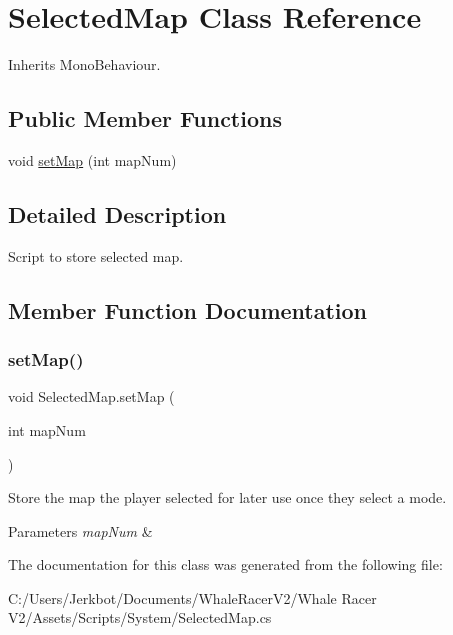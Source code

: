 \hypertarget{class_selected_map}{}\section{Selected\+Map Class Reference}
\label{class_selected_map}


Inherits Mono\+Behaviour.

\subsection*{Public Member Functions}
\begin{DoxyCompactItemize}
\item 
void \hyperlink{class_selected_map_a2667f413fa07f31a89c42f88471afdb7}{set\+Map} (int map\+Num)
\end{DoxyCompactItemize}


\subsection{Detailed Description}
Script to store selected map. 



\subsection{Member Function Documentation}
\mbox{\label{class_selected_map_a2667f413fa07f31a89c42f88471afdb7}} 
\subsubsection{\texorpdfstring{set\+Map()}{setMap()}}
{\footnotesize\ttfamily void Selected\+Map.\+set\+Map (\begin{DoxyParamCaption}\item[{int}]{map\+Num }\end{DoxyParamCaption})}



Store the map the player selected for later use once they select a mode. 


\begin{DoxyParams}{Parameters}
{\em map\+Num} & \\
\hline
\end{DoxyParams}


The documentation for this class was generated from the following file\+:\begin{DoxyCompactItemize}
\item 
C\+:/\+Users/\+Jerkbot/\+Documents/\+Whale\+Racer\+V2/\+Whale Racer V2/\+Assets/\+Scripts/\+System/Selected\+Map.\+cs\end{DoxyCompactItemize}
